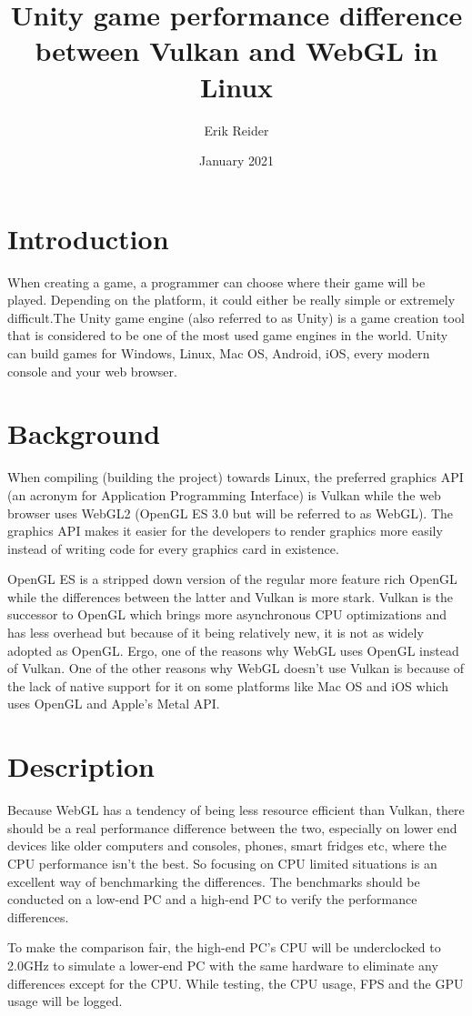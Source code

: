 \documentclass{article}
\title{Unity game performance difference between Vulkan and WebGL in Linux}
\author{Erik Reider}
\date{January 2021}
\begin{document}
\maketitle

\section{Introduction}
When creating a game, a programmer can choose where their game will be played. Depending on the platform, it could either be really simple or extremely difficult.The Unity game engine (also referred to as Unity) is a game creation tool that is considered to be one of the most used game engines in the world. Unity can build games for Windows, Linux, Mac OS, Android, iOS, every modern console and your web browser.

\section{Background}
When compiling (building the project) towards Linux, the preferred graphics API (an acronym for Application Programming Interface) is Vulkan while the web browser uses WebGL2 (OpenGL ES 3.0 but will be referred to as WebGL). The graphics API makes it easier for the developers to render graphics more easily instead of writing code for every graphics card in existence. \par

OpenGL ES is a stripped down version of the regular more feature rich OpenGL while the differences between the latter and Vulkan is more stark. Vulkan is the successor to OpenGL which brings more asynchronous CPU optimizations and has less overhead but because of it being relatively new, it is not as widely adopted as OpenGL. Ergo, one of the reasons why WebGL uses OpenGL instead of Vulkan. One of the other reasons why WebGL doesn’t use Vulkan is because of the lack of native support for it on some platforms like Mac OS and iOS which uses OpenGL and Apple’s Metal API.


\section{Description}
Because WebGL has a tendency of being less resource efficient than Vulkan, there should be a real performance difference between the two, especially on lower end devices like older computers and consoles, phones, smart fridges etc, where the CPU performance isn’t the best. So focusing on CPU limited situations is an excellent way of benchmarking the differences. The benchmarks should be conducted on a low-end PC and a high-end PC to verify the performance differences. \par
To make the comparison fair, the high-end PC’s CPU will be underclocked to 2.0GHz to simulate a lower-end PC with the same hardware to eliminate any differences except for the CPU. While testing, the CPU usage, FPS and the GPU usage will be logged.
\end{document}
